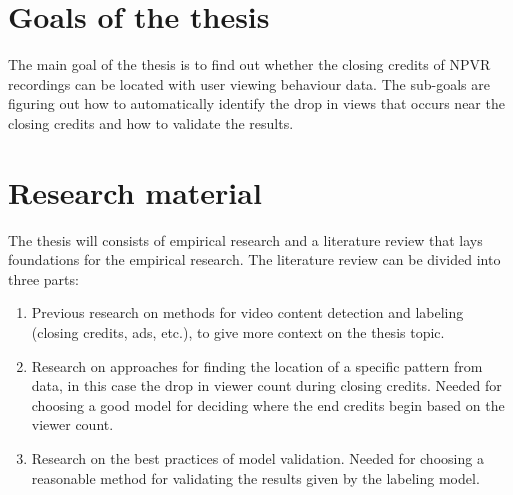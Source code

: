 \documentclass[12pt,a4paper,english,oneside]{article}
\begin{document}
\section{Goals of the thesis}

The main goal of the thesis is to find out whether the closing credits of NPVR recordings can be located with user viewing behaviour data. The sub-goals are figuring out how to automatically identify the drop in views that occurs near the closing credits and how to validate the results.

\section{Research material}

The thesis will consists of empirical research and a literature review that lays foundations for the empirical research. The literature review can be divided into three parts:

\begin{enumerate}
    \item Previous research on methods for video content detection and labeling (closing credits, ads, etc.), to give more context on the thesis topic.
    \item Research on approaches for finding the location of a specific pattern from data, in this case the drop in viewer count during closing credits. Needed for choosing a good model for deciding where the end credits begin based on the viewer count.
    \item Research on the best practices of model validation. Needed for choosing a reasonable method for validating the results given by the labeling model.
\end{enumerate}

\end{document}
